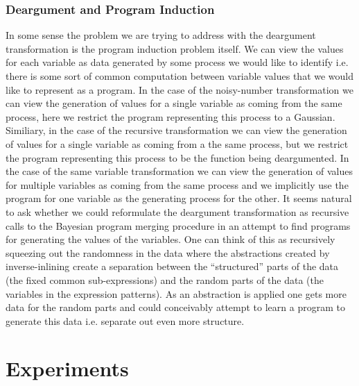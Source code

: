 \documentclass[a4paper,10pt]{article}
\begin{document}
\subsubsection{Deargument and Program Induction}
In some sense the problem we are trying to address with the deargument transformation is the program induction problem itself.  We can view the values for each variable as data generated by some process we would like to identify i.e. there is some sort of common computation between variable values that we would like to represent as a program.  In the case of the noisy-number transformation we can view the generation of values for a single variable as coming from the same process, here we restrict the program representing this process to a Gaussian.  Similiary, in the case of the recursive transformation we can view the generation of values for a single variable as coming from a the same process, but we restrict the program representing this process to be the function being deargumented.  In the case of the same variable transformation we can view the generation of values for multiple variables as coming from the same process and we implicitly use the program for one variable as the generating process for the other.  It seems natural to ask whether we could reformulate the deargument transformation as recursive calls to the Bayesian program merging procedure in an attempt to find programs for generating the values of the variables.  One can think of this as recursively squeezing out the randomness in the data where the abstractions created by inverse-inlining create a separation between the ``structured'' parts of the data (the fixed common sub-expressions) and the random parts of the data (the variables in the expression patterns).  As an abstraction is applied one gets more data for the random parts and could conceivably attempt to learn a program to generate this data i.e. separate out even more structure.
\section{Experiments}
\end{document}
